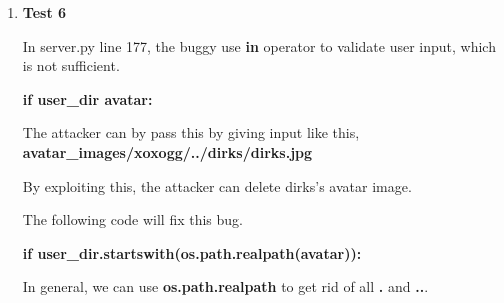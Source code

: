 \documentclass[11pt]{article}
\newenvironment{qparts}{\begin{enumerate}[{(}a{)}]}{\end{enumerate}}
\begin{document}
\begin{qparts}
	\textbf{session = escape\_sql(session)}
	
	In general, we can use prepared statement to construct sql query. The standard library will sanitize input properly.
	
	\item \textbf{Test 6}
	
	In server.py line 177, the buggy use \textbf{in} operator to validate user input, which is not sufficient.
	
	\textbf{if user\_dir  avatar:}
	
	The attacker can by pass this by giving input like this, \textbf{avatar\_images/xoxogg/../dirks/dirks.jpg}
	
	By exploiting this, the attacker can delete dirks's avatar image.
	
	The following code will fix this bug.
	
	\textbf{if user\_dir.startswith(os.path.realpath(avatar)):}
	
	In general, we can use \textbf{os.path.realpath} to get rid of all \textbf{.} and \textbf{..}.

\end{qparts}


\newpage
\end{document}
